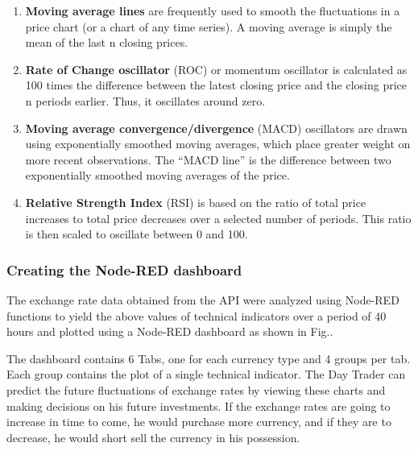 \begin{enumerate}[itemsep=-1.7mm]
\item \textbf{Moving average lines} are frequently used to smooth the fluctuations in a price chart (or a chart of any time series). A moving average is simply the mean of the last n closing prices.

\item \textbf{Rate of Change oscillator} (ROC) or momentum oscillator is calculated as 100 times the difference between the latest closing price and the closing price n periods earlier. Thus, it oscillates around zero.

\item \textbf{Moving average convergence/divergence} (MACD) oscillators are drawn using exponentially smoothed moving averages, which place greater weight on more recent observations. The “MACD line” is the difference between two exponentially smoothed moving averages of the price.

\item \textbf{Relative Strength Index} (RSI) is based on the ratio of total price increases to total price decreases over a selected number of periods. This ratio is then scaled to oscillate between 0 and 100.
\end{enumerate}

\subsubsection{Creating the Node-RED dashboard}

The exchange rate data obtained from the API were analyzed using Node-RED functions to yield the above values of technical indicators over a period of 40 hours and plotted using a Node-RED dashboard as shown in Fig..

The dashboard contains 6 Tabs, one for each currency type and 4 groups per tab. Each group contains the plot of  a single technical indicator. The Day Trader can predict the future fluctuations of exchange rates by viewing these charts and making decisions on his future investments. If the exchange rates are going to increase in time to come, he would purchase more currency, and if they are to decrease, he would short sell the currency in his possession.
